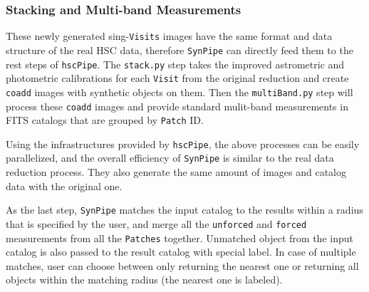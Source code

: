 \documentclass[useamsfonts]{pasj01}
\def\hscpipe{\texttt{hscPipe}}
\def\synpipe{\texttt{SynPipe}}
\def\forced{\texttt{forced}}
\def\unforced{\texttt{unforced}}
\def\visit{\texttt{Visit}}
\def\visits{\texttt{Visits}}
\begin{document}
\subsubsection{Stacking and Multi-band Measurements}
    \label{sssec:multiband}

    These newly generated sing-\visits{} images have the same format and data
    structure of the real HSC data, therefore \synpipe{} can directly feed them
    to the rest steps of \hscpipe{}.
    The \texttt{stack.py} step takes the improved astrometric and photometric
    calibrations for each \visit{} from the original reduction and create
    \texttt{coadd} images with synthetic objects on them.
    Then the \texttt{multiBand.py} step will process these \texttt{coadd} images and
    provide standard mulit-band measurements in FITS catalogs that are grouped by
    \texttt{Patch} ID.

    Using the infrastructures provided by \hscpipe{}, the above processes can be
    easily parallelized, and the overall efficiency of \synpipe{} is similar to the
    real data reduction process.
    They also generate the same amount of images and catalog data with the original
    one.

    As the last step, \synpipe{} matches the input catalog to the results within a
    radius that is specified by the user, and merge all the \unforced{} and
    \forced{} measurements from all the \texttt{Patches} together.
    Unmatched object from the input catalog is also passed to the result catalog with
    special label.
    In case of multiple matches, user can choose between only returning the nearest
    one or returning all objects within the matching radius (the nearest one is
    labeled).
\end{document}
